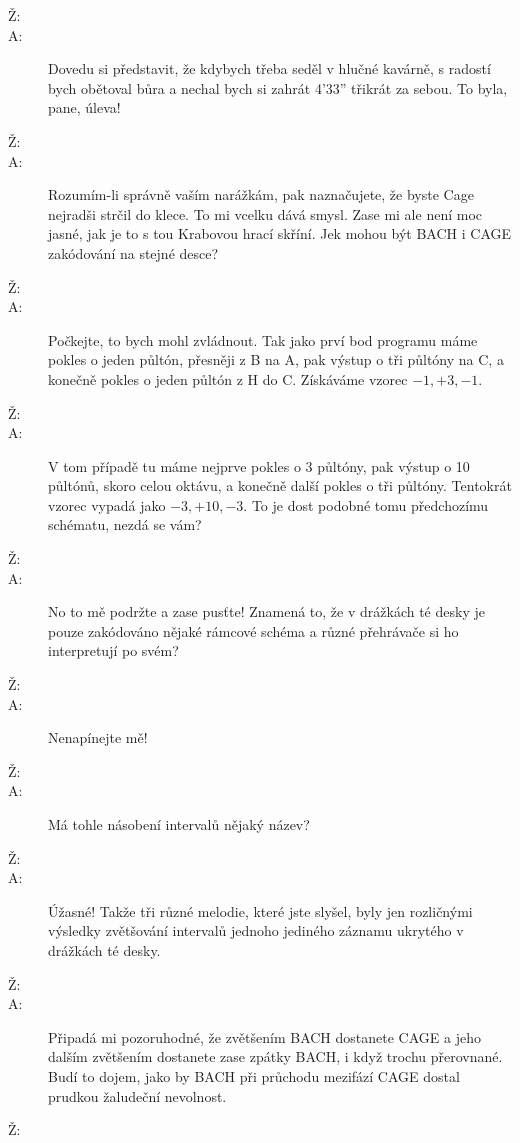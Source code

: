 \documentclass[12pt]{article}
\begin{document}
\begin{description}
\item[Ž:]

\item[A:] Dovedu si představit, že kdybych třeba seděl v hlučné kavárně, s radostí
    bych obětoval bůra a nechal bych si zahrát 4'33'' třikrát za sebou. To byla, pane, úleva!

\item[Ž:]

\item[A:] Rozumím-li správně vaším narážkám, pak naznačujete, že byste Cage nejradši
    strčil do klece. To mi vcelku dává smysl. Zase mi ale není moc jasné, jak je
    to s tou Krabovou hrací skříní. Jek mohou být BACH i CAGE zakódování na stejné
    desce?

\item[Ž:]

\item[A:] Počkejte, to bych mohl zvládnout. Tak jako prví bod programu
    máme pokles o jeden půltón, přesněji z B na A, pak výstup o tři půltóny
    na C, a konečně pokles o jeden půltón z H do C. Získáváme vzorec $-1, +3, -1$.

\item[Ž:]

\item[A:] V tom případě tu máme nejprve pokles o 3 půltóny, pak výstup o
    10 půltónů, skoro celou oktávu, a konečně další pokles o tři půltóny.
    Tentokrát vzorec vypadá jako $-3, +10, -3$. To je dost podobné
    tomu předchozímu schématu, nezdá se vám?

\item[Ž:]

\item[A:] No to mě podržte a zase pusťte! Znamená to, že v drážkách té desky
    je pouze zakódováno nějaké rámcové schéma a různé přehrávače si ho interpretují
    po svém?

\item[Ž:]

\item[A:] Nenapínejte mě!

\item[Ž:]

\item[A:] Má tohle násobení intervalů nějaký název?

\item[Ž:]

\item[A:] Úžasné! Takže tři různé melodie, které jste slyšel, byly jen rozličnými
    výsledky zvětšování intervalů jednoho jediného záznamu ukrytého v drážkách té desky.

\item[Ž:]

\item[A:] Připadá mi pozoruhodné, že zvětšením BACH dostanete CAGE a jeho dalším
    zvětšením dostanete zase zpátky BACH, i když trochu přerovnané.
    Budí to dojem, jako by BACH při průchodu mezifází CAGE dostal prudkou žaludeční
    nevolnost.

\item[Ž:]

\end{description}
\end{document}
